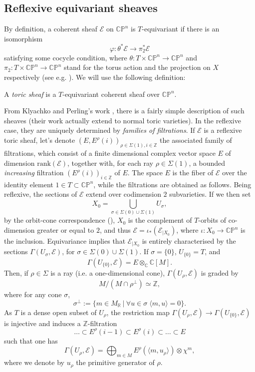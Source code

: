 \documentclass[a4paper,10pt]{amsart}
\theoremstyle{plain}{
    \newtheorem{theorem}{Theorem}[section]
    \newtheorem{lemma}[theorem]{Lemma}
    \newtheorem{corollary}[theorem]{Corollary}
    \newtheorem{proposition}[theorem]{Proposition}
    \newtheorem{conjecture}[theorem]{Conjecture}
}
\theoremstyle{definition}{
    \newtheorem{definition}[theorem]{Definition}
    \newtheorem{defn-thm}[theorem]{Definition-Theorem}
    \newtheorem{example}[theorem]{Example}
    \newtheorem{notation}[theorem]{Notation}
}
\theoremstyle{remark}{
    \newtheorem{remark}[theorem]{Remark}
    \newtheorem{problem}[theorem]{Problem}
    \newtheorem{question}[theorem]{Question}
}
\def\rank{\mathrm{rank}}
\def\cE{\mathcal{E}}
\def\R{\mathbb{R}}
\def\Z{\mathbb{Z}}
\def\P{\mathbb{P}}
\def\C{\mathbb{C}}
\begin{document}
 \subsection{Reflexive equivariant sheaves}
 \label{sec:reflexive equiv sheaves}
 By definition, a coherent sheaf $\cE$ on $\C\P^n$ is $T$-equivariant if there is an isomorphism
$$\varphi : \theta^*\cE \to \pi_2^*\cE$$
satisfying some cocycle condition, where $\theta : T \times \C\P^n \to \C\P^n$ and $\pi_2 : T\times \C\P^n \to \C\P^n$ stand for the torus action and the projection on $X$ respectively (see e.g. \cite{Per04}). We will use the following definition:
\begin{definition}
 \label{def:toricsheaves}
 A {\it toric sheaf} is a $T$-equivariant coherent sheaf over $\C\P^n$.
\end{definition}
From Klyachko and Perling's work \cite{Kly90,Per04}, there is a fairly simple description of such sheaves (their work actually extend to normal toric varieties). In the reflexive case, they are uniquely determined by {\it families of filtrations}. If $\cE$ is a reflexive toric sheaf,  let's denote $(E,E^\rho(i))_{\rho\in\Sigma(1),i\in\Z}$ the associated family of filtrations, which consist of a finite dimensional complex vector space $E$ of dimension $\rank(\cE)$, together with, for each ray $\rho\in\Sigma(1)$, a bounded {\it increasing} filtration $(E^\rho(i))_{i\in\Z}$ of $E$.
The space $E$ is the fiber of $\cE$ over the identity element  $1\in T\subset \C\P^n$, while the filtrations are obtained as follows. Being reflexive,  the  sections of $\cE$ extend over codimension $2$ subvarieties. If we then set
$$
X_0=\bigcup_{\sigma\in\Sigma(0)\cup\Sigma(1)} U_\sigma,
$$ 
by the orbit-cone correspondence (\cite[Section 3.2]{CLS}), $X_0$ is the complement of $T$-orbits of co-dimension greater or equal to $2$, and thus $\cE=\iota_*(\cE_{\vert X_0})$, where $\iota : X_0 \to \C\P^n$ is the inclusion. Equivariance implies that $\cE_{\vert X_0}$ is entirely characterised by the sections $\Gamma(U_\sigma,\cE)$, for $\sigma\in\Sigma(0)\cup\Sigma(1)$. If $\sigma=\lbrace 0 \rbrace$, $U_{\lbrace 0\rbrace}=T$, and
$$
\Gamma(U_{\lbrace 0\rbrace},\cE)=E\otimes_\C \C[M].
$$
 Then, if $\rho\in \Sigma$ is a ray (i.e. a one-dimensional cone), $\Gamma(U_{\rho}, \cE)$ is graded by $$M/( M\cap \rho^\perp)\simeq\Z,$$
 where for any cone $\sigma$, 
 $$
 \sigma^\perp:=\lbrace m\in M_\R\:\vert\:\forall u\in \sigma\; \langle m,u\rangle =0\rbrace.
 $$
 As $T$ is a dense open subset of $U_\rho$, the restriction map $\Gamma(U_\rho,\cE)\to\Gamma(U_{\lbrace 0\rbrace},\cE)$ is injective and induces a $\Z$-filtration 
$$
  \ldots \subset E^\rho(i-1)\subset E^\rho(i) \subset \ldots \subset E
$$
such that one has
 \begin{equation*}
  \label{eq:sheaf from filtrations for rays}
  \Gamma(U_{\rho}, \cE)=\bigoplus_{m\in M} E^\rho(\langle m,u_\rho\rangle)\otimes \chi^m,
 \end{equation*}
 where we denote by $u_\rho$ the primitive generator of $\rho$.
\end{document}
